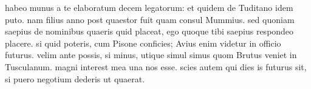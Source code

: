 


 habeo munus a te elaboratum decem legatorum: et quidem de Tuditano idem puto. nam filius anno post quaestor fuit quam consul Mummius. sed quoniam saepius de nominibus quaeris quid placeat, ego quoque tibi saepius respondeo placere. si quid poteris, cum Pisone conficies; Avius enim videtur in officio futurus. velim ante possis, si minus, utique simul simus quom Brutus veniet in Tusculanum. magni interest mea una nos esse. scies autem qui dies is futurus sit, si puero negotium dederis ut quaerat.
